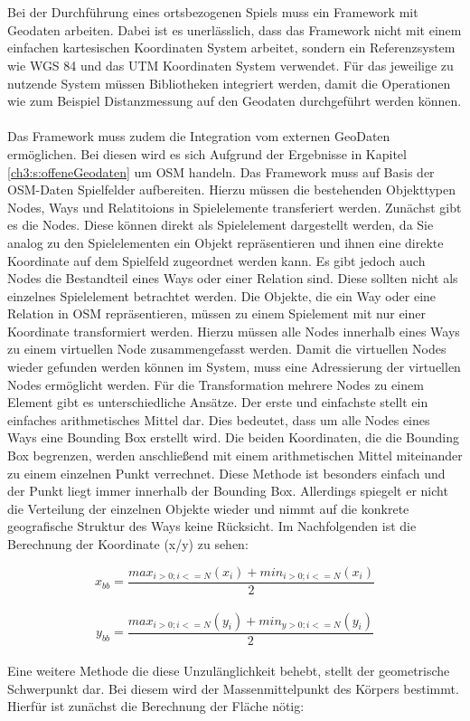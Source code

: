 \\\\
Bei der Durchführung eines ortsbezogenen Spiels muss ein Framework mit Geodaten arbeiten.
Dabei ist es unerlässlich, dass das Framework nicht mit einem einfachen kartesischen Koordinaten System arbeitet, sondern ein Referenzsystem wie WGS 84 \cite{Grafarend.1998} und das UTM Koordinaten System \cite{Grafarend.1995} verwendet.
Für das jeweilige zu nutzende System müssen Bibliotheken integriert werden, damit die Operationen wie zum Beispiel Distanzmessung auf den Geodaten durchgeführt werden können.
\\\\
Das Framework muss zudem die Integration vom externen GeoDaten ermöglichen. Bei diesen wird es sich Aufgrund der Ergebnisse in Kapitel \ref{ch3:s:offeneGeodaten} um OSM handeln.
Das Framework muss auf Basis der OSM-Daten Spielfelder aufbereiten. Hierzu müssen die bestehenden Objekttypen Nodes, Ways und Relatitoions in Spielelemente transferiert werden.
Zunächst gibt es die Nodes. Diese können direkt als Spielelement dargestellt werden, da Sie analog zu den Spielelementen ein Objekt repräsentieren und ihnen eine direkte Koordinate auf dem Spielfeld zugeordnet werden kann. Es gibt jedoch auch Nodes die Bestandteil eines Ways oder einer Relation sind. Diese sollten nicht als einzelnes Spielelement betrachtet werden.
Die Objekte, die ein Way oder eine Relation in OSM repräsentieren, müssen zu einem Spielement mit nur einer Koordinate transformiert werden. Hierzu müssen alle Nodes innerhalb eines Ways zu einem \glqq virtuellen\grqq{} Node zusammengefasst werden.
Damit die virtuellen Nodes wieder gefunden werden können im System, muss eine Adressierung der virtuellen Nodes ermöglicht werden.
Für die Transformation mehrere Nodes zu einem Element gibt es unterschiedliche Ansätze. Der erste und einfachste stellt ein einfaches arithmetisches Mittel dar. Dies bedeutet, dass um alle Nodes eines Ways eine Bounding Box erstellt wird. Die beiden Koordinaten, die die Bounding Box begrenzen, werden anschließend mit einem arithmetischen Mittel miteinander zu einem einzelnen Punkt verrechnet. Diese Methode ist besonders einfach und der Punkt liegt immer innerhalb der Bounding Box. Allerdings spiegelt er nicht die Verteilung der einzelnen Objekte wieder und nimmt auf die konkrete geografische Struktur des Ways keine Rücksicht. Im Nachfolgenden ist die Berechnung der Koordinate (x/y) zu sehen:

\begin{equation}
x_{bb} = \frac{max_{i>0; i<=N}(x_i) + min_{i>0; i<=N}(x_i)}{2}
\end{equation}
\\
\begin{equation}
y_{bb} = \frac{max_{i>0; i<=N}(y_i) + min_{y>0; i<=N}(y_i)}{2}
\end{equation}
\\
Eine weitere Methode die diese Unzulänglichkeit behebt, stellt der geometrische Schwerpunkt dar.
Bei diesem wird der Massenmittelpunkt des Körpers bestimmt.\cite{Papula.2006} Hierfür ist zunächst die Berechnung der Fläche nötig:

